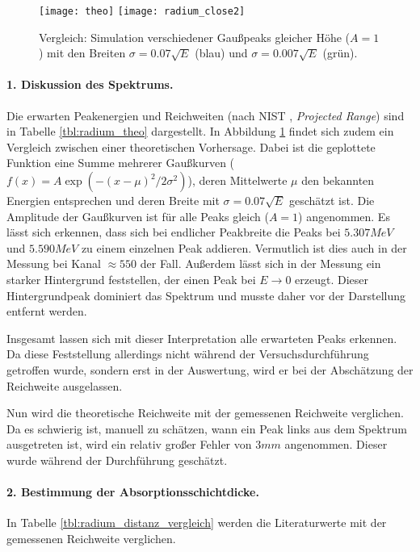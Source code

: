 \documentclass{../Misc/MontavonLaTeX/Montavon}
\newcommand{\halfwidth}{0.48\textwidth}
\begin{document}
\begin{figure}[htbp]
\centering
\texttt{[image: theo]}
\texttt{[image: radium\_close2]}
\caption{Vergleich: Simulation verschiedener Gaußpeaks gleicher Höhe ($A = 1$) mit den Breiten $\sigma = 0.07 \sqrt{E}$ (blau) und $\sigma = 0.007 \sqrt{E}$ (grün).}
\label{fig:radium_theo}
\end{figure}

\paragraph{1. Diskussion des Spektrums.} 
Die erwarten Peakenergien und Reichweiten (nach NIST \cite{nist_alpha}, \emph{Projected Range}) sind in Tabelle \ref{tbl:radium_theo} dargestellt. In Abbildung \ref{fig:radium_theo} findet sich zudem ein Vergleich zwischen einer theoretischen Vorhersage. Dabei ist die geplottete Funktion eine Summe mehrerer Gaußkurven ($f(x) = A \exp\left(-(x-\mu)^2 / 2 \sigma^2 \right)$), deren Mittelwerte $\mu$ den bekannten Energien entsprechen und deren Breite mit $\sigma = 0.07 \sqrt{E}$ geschätzt ist. Die Amplitude der Gaußkurven ist für alle Peaks gleich ($A = 1$) angenommen. Es lässt sich erkennen, dass sich bei endlicher Peakbreite die Peaks bei $5.307 \unit{MeV}$ und $5.590 \unit{MeV}$  zu einem einzelnen Peak addieren. Vermutlich ist dies auch in der Messung bei Kanal $\approx 550$ der Fall. 
Außerdem lässt sich in der Messung ein starker Hintergrund feststellen, der einen Peak bei $E \rightarrow 0$ erzeugt. Dieser Hintergrundpeak dominiert das Spektrum und musste daher vor der Darstellung entfernt werden.

Insgesamt lassen sich mit dieser Interpretation alle erwarteten Peaks erkennen. Da diese Feststellung allerdings nicht während der Versuchsdurchführung getroffen wurde, sondern erst in der Auswertung, wird er bei der Abschätzung der Reichweite ausgelassen.

Nun wird die theoretische Reichweite mit der gemessenen Reichweite verglichen. Da es schwierig ist, manuell zu schätzen, wann ein Peak links aus dem Spektrum ausgetreten ist, wird ein relativ großer Fehler von $3 \unit{mm}$ angenommen. Dieser wurde während der Durchführung geschätzt.

\paragraph{2. Bestimmung der Absorptionsschichtdicke.} 
In Tabelle \ref{tbl:radium_distanz_vergleich} werden die Literaturwerte mit der gemessenen Reichweite verglichen. 
\end{document}
